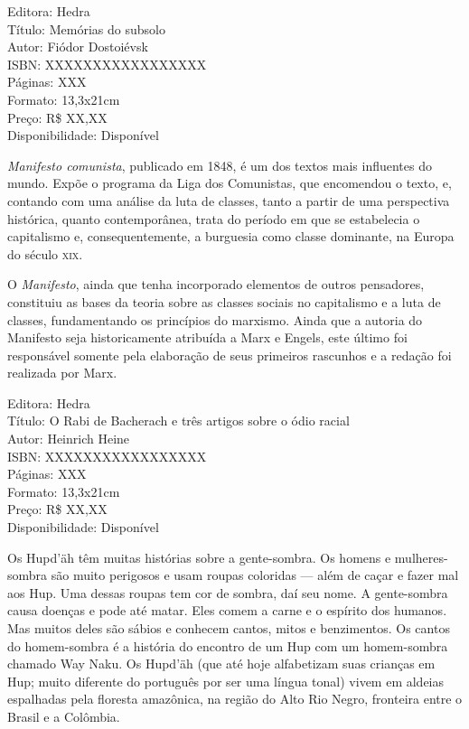\begin{ficha}
Editora: Hedra\\
Título: Memórias do subsolo\\
Autor: Fiódor Dostoiévsk\\ 
ISBN: XXXXXXXXXXXXXXXXX\\
Páginas: XXX\\
Formato: 13,3x21cm\\
Preço: R\$ XX,XX\\
Disponibilidade: Disponível
\end{ficha}

\pagebreak


\noindent{}\textit{Manifesto comunista}, publicado em 1848, é um dos textos mais influentes do mundo. Expõe o programa da Liga dos Comunistas, que encomendou o texto, e, contando com uma análise da luta de classes, tanto a partir de uma perspectiva histórica, quanto contemporânea, trata do período em que se estabelecia o capitalismo e, consequentemente, a burguesia como classe dominante, na Europa do século \textsc{xix}.

O \textit{Manifesto}, ainda que tenha incorporado elementos de outros pensadores, constituiu as bases da teoria sobre as classes sociais no capitalismo e a luta de classes, fundamentando os princípios do marxismo. Ainda que a autoria do Manifesto seja historicamente atribuída a Marx e Engels, este último foi responsável somente pela elaboração de seus primeiros rascunhos e a redação foi realizada por Marx.

\begin{ficha}
Editora: Hedra\\
Título: O Rabi de Bacherach e três artigos sobre o ódio racial\\
Autor: Heinrich Heine\\ 
ISBN: XXXXXXXXXXXXXXXXX\\
Páginas: XXX\\
Formato: 13,3x21cm\\
Preço: R\$ XX,XX\\
Disponibilidade: Disponível
\end{ficha}

\pagebreak


\noindent{}Os Hupd’äh têm muitas histórias sobre a gente-sombra. Os homens e mulheres-sombra são muito perigosos e usam roupas coloridas — além de caçar e fazer mal aos Hup. Uma dessas roupas tem cor de sombra, daí seu nome. A gente-sombra causa doenças e pode até matar. Eles comem a carne e o espírito dos humanos. Mas muitos deles são sábios e conhecem cantos, mitos e benzimentos. Os cantos do homem-sombra é a história do encontro de um Hup com um homem-sombra chamado Way Naku. Os Hupd’äh (que até hoje alfabetizam suas crianças em Hup; muito diferente do português por ser uma língua tonal) vivem em aldeias espalhadas pela floresta amazônica, na região do Alto Rio Negro, fronteira entre o Brasil e a Colômbia.


